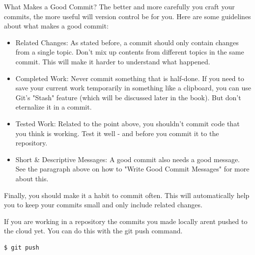\documentclass{article}
\begin{document}
\begin{concept}What Makes a Good Commit?
\newline\newline
The better and more carefully you craft your commits, the more useful will version control be for you. Here are some guidelines about what makes a good commit:
\begin{itemize}
    \item Related Changes: As stated before, a commit should only contain changes from a single topic. Don't mix up contents from different topics in the same commit. This will make it harder to understand what happened.
    \item Completed Work: Never commit something that is half-done. If you need to save your current work temporarily in something like a clipboard, you can use Git's "Stash" feature (which will be discussed later in the book). But don't eternalize it in a commit.
    \item Tested Work: Related to the point above, you shouldn't commit code that you think is working. Test it well - and before you commit it to the repository.
    \item Short \& Descriptive Messages: A good commit also needs a good message. See the paragraph above on how to "Write Good Commit Messages" for more about this.
\end{itemize}
Finally, you should make it a habit to commit often. This will automatically help you to keep your commits small and only include related changes.

 \end{concept}

If you are working in a repository the commits you made locally arent pushed to the cloud yet. You can do this with the git push command.

\begin{lstlisting}[language=bash]
$ git push
\end{lstlisting}
\end{document}
